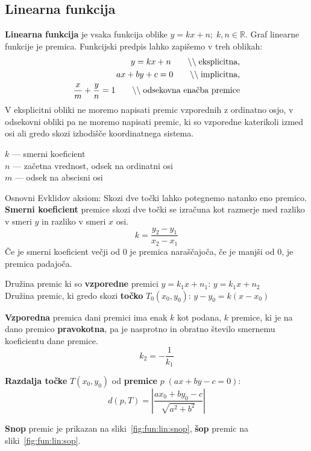 \documentclass[a4paper,oneside,12pt,fleqn]{article}
\def\R{\ensuremath{\mathbb R}}
\newcommand{\comment}[1]{\ensuremath{\qquad\backslash\backslash\;}\textnormal{#1}}
\numberwithin{equation}{section}
\begin{document}
\subsection{Linearna funkcija}
\textbf{Linearna funkcija} je vsaka funkcija oblike $y = kx + n; \; k, n \in \R$.
Graf linearne funkcije je premica. Funkcijski predpis lahko zapišemo v treh oblikah:
\label{sec:fun:lin}
\begin{align*}
  y = kx + n \comment{eksplicitna,} \\
  ax + by + c = 0 \comment{implicitna,} \\
  \frac{x}{m} + \frac{y}{n} = 1 \comment{odsekovna enačba premice}
\end{align*}
V eksplicitni obliki ne moremo napisati premic vzporednih z ordinatno osjo, v odsekovni
obliki pa ne moremo napisati premic, ki so vzporedne katerikoli izmed osi ali gredo skozi
izhodišče koordinatnega sistema.

$k$ --- smerni koeficient \\
$n$ --- začetna vrednost, odsek na ordinatni osi \\
$m$ --- odsek na abscisni osi

Osnovni Evklidov aksiom: Skozi dve točki lahko potegnemo natanko eno premico.
\textbf{Smerni koeficient} premice skozi dve točki se izračuna kot razmerje med razliko v smeri $y$
in razliko v smeri $x$ osi.
\[ k = \frac{y_2 - y_1}{x_2 - x_1} \]
Če je smerni koeficient večji od 0 je premica naraščajoča, če je manjši od 0, je premica
padajoča.

Družina premic ki so \textbf{vzporedne} premici $y = k_1x+n_1$: $y=k_1x+n_2$ \\
Družina premic, ki gredo skozi \textbf{točko} $T_0(x_0,y_0)$: $y - y_0 = k(x-x_0)$ 

\textbf{Vzporedna} premica dani premici ima enak $k$ kot podana, $k$ premice, ki je na dano premico
\textbf{pravokotna}, pa je nasprotno in obratno število smernemu koeficientu dane premice.
\[ k_2 = -\frac{1}{k_1} \]

\textbf{Razdalja točke} $T(x_0, y_0)$ od \textbf{premice} $p\;(ax+by-c=0)$:
\[ d(p, T) = \left|\frac{ax_0+by_0-c}{\sqrt{a^2+b^2}}\right|  \]

\textbf{Snop} premic je prikazan na sliki~\ref{fig:fun:lin:snop}, \textbf{šop} premic na sliki~\ref{fig:fun:lin:sop}.
\end{document}
